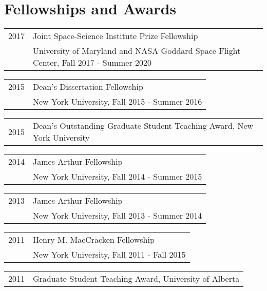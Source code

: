 \documentclass[letterpaper]{article}
\renewenvironment{itemize}{
  \begin{list}{}{
    \setlength{\leftmargin}{1.5em}
  }
}{
  \end{list}
}
\begin{document}
\section*{Fellowships and Awards}
\begin{itemize}
\item \begin{tabular}{ll}
2017 & Joint Space-Science Institute Prize Fellowship \\
& University of Maryland and NASA Goddard Space Flight Center, Fall 2017 - Summer 2020 \\
\end{tabular}

\item \begin{tabular}{ll}
2015 & Dean's Dissertation Fellowship \\
& New York University, Fall 2015 - Summer 2016 \\
\end{tabular}

\item \begin{tabular}{ll}
2015 & Dean's Outstanding Graduate Student Teaching Award, New York University
\end{tabular}

\item \begin{tabular}{ll}
2014 & James Arthur Fellowship \\
& New York University, Fall 2014 - Summer 2015 \\
\end{tabular}

\item \begin{tabular}{ll}
2013 & James Arthur Fellowship \\
& New York University, Fall 2013 - Summer 2014 \\
\end{tabular}

\item \begin{tabular}{ll}
2011 & Henry M. MacCracken Fellowship \\
& New York University, Fall 2011 - Fall 2015 \\
\end{tabular}

\item \begin{tabular}{ll}
2011 & Graduate Student Teaching Award, University of Alberta \\
\end{tabular}


\end{itemize}
\end{document}

